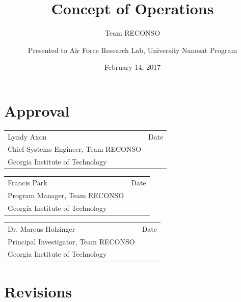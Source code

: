 \documentclass{article}
\title{\vspace{2in} \textbf{Concept of Operations}}
\author{Team RECONSO}
\date{February 14, 2017}
\author{Presented to Air Force Research Lab, University Nanosat Program}
\begin{document}
\maketitle\thispagestyle{fancy}

\newpage

\section*{\center Approval}
\vspace{1in}
\begin{center}
	\begin{tabular}{p{3in}p{1in}}
		& \\ \hline
		Lyndy Axon & \hfill Date \\
		Chief Systems Engineer, Team RECONSO \\
		Georgia Institute of Technology \\
	\end{tabular}
\end{center}
\begin{center}
\begin{tabular}{p{3in}p{1in}}
    & \\ \hline
    Francis Park & \hfill Date \\
    Program Manager, Team RECONSO & \\
    Georgia Institute of Technology & \\
\end{tabular}
\end{center}
\vspace{0.5in}

\vspace{0.5in}
\begin{center}
\begin{tabular}{p{3in}p{1in}}
    & \\ \hline
    Dr. Marcus Holzinger & \hfill Date \\
    Principal Investigator, Team RECONSO \\
    Georgia Institute of Technology \\
\end{tabular}
\end{center}

\newpage


\section*{\centering Revisions}
\end{document}
